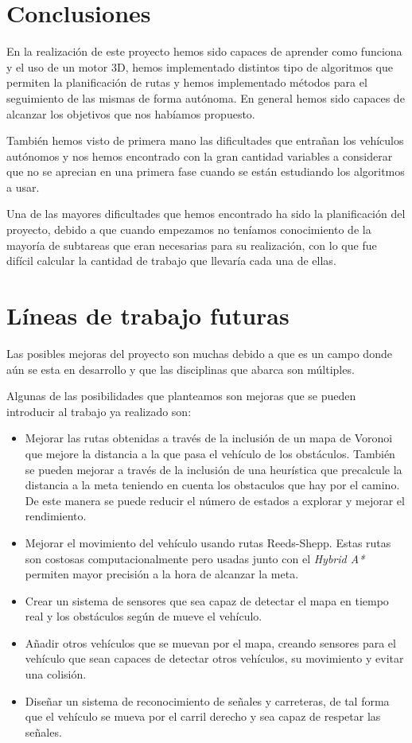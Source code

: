 
\section{Conclusiones}
En la realización de este proyecto hemos sido capaces de aprender como funciona y el uso de un motor 3D, hemos implementado distintos tipo de algoritmos que permiten la planificación de rutas y hemos implementado métodos para el seguimiento de las mismas de forma autónoma. En general hemos sido capaces de alcanzar los objetivos que nos habíamos propuesto.

También hemos visto de primera mano las dificultades que entrañan los vehículos autónomos y nos hemos encontrado con la gran cantidad variables a considerar que no se aprecian en una primera fase cuando se están estudiando los algoritmos a usar.

Una de las mayores dificultades que hemos encontrado ha sido la planificación del proyecto, debido a que cuando empezamos no teníamos conocimiento de la mayoría de subtareas que eran necesarias para su realización, con lo que fue difícil calcular la cantidad de trabajo que llevaría cada una de ellas.

\section{Líneas de trabajo futuras}
Las posibles mejoras del proyecto son muchas debido a que es un campo donde aún se esta en desarrollo y que las disciplinas que abarca son múltiples.

Algunas de las posibilidades que planteamos son mejoras que se pueden introducir al trabajo ya realizado son:
\begin{itemize}
\item Mejorar las rutas obtenidas a través de la inclusión de un mapa de Voronoi que mejore la distancia a la que pasa el vehículo de los obstáculos. También se pueden mejorar a través de la inclusión de una heurística que precalcule la distancia a la meta teniendo en cuenta los obstaculos que hay por el camino. De este manera se puede reducir el número de estados a explorar y mejorar el rendimiento.
\item Mejorar el movimiento del vehículo usando rutas Reeds-Shepp. Estas rutas son costosas computacionalmente pero usadas junto con el \textit{Hybrid A*} permiten mayor precisión a la hora de alcanzar la meta.
\item Crear un sistema de sensores que sea capaz de detectar el mapa en tiempo real y los obstáculos según de mueve el vehículo.
\item Añadir otros vehículos que se muevan por el mapa, creando sensores para el vehículo que sean capaces de detectar otros vehículos, su movimiento y evitar una colisión.
\item Diseñar un sistema de reconocimiento de señales y carreteras, de tal forma que el vehículo se mueva por el carril derecho y sea capaz de respetar las señales.
\end{itemize}
